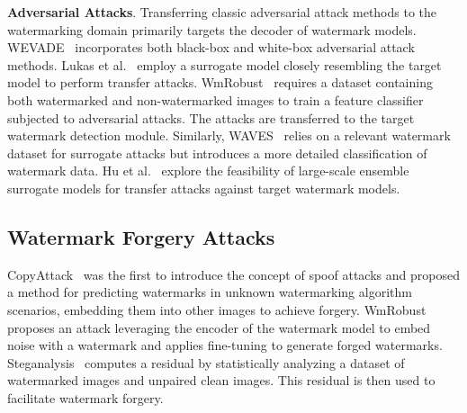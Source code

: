 \textbf{Adversarial Attacks}. Transferring classic adversarial attack methods to the watermarking domain primarily targets the decoder of watermark models. WEVADE~\cite{jiang2023evading} incorporates both black-box and white-box adversarial attack methods. Lukas et al.~\cite{lukas2024leveraging} employ a surrogate model closely resembling the target model to perform transfer attacks. WmRobust~\cite{saberi2023robustness} requires a dataset containing both watermarked and non-watermarked images to train a feature classifier subjected to adversarial attacks. The attacks are transferred to the target watermark detection module. Similarly, WAVES~\cite{an2024benchmarking} relies on a relevant watermark dataset for surrogate attacks but introduces a more detailed classification of watermark data. Hu et al.~\cite{hu2024transfer} explore the feasibility of large-scale ensemble surrogate models for transfer attacks against target watermark models.

\subsection{Watermark Forgery Attacks}
CopyAttack~\cite{kutter2000watermark} was the first to introduce the concept of spoof attacks and proposed a method for predicting watermarks in unknown watermarking algorithm scenarios, embedding them into other images to achieve forgery. WmRobust~\cite{saberi2023robustness} proposes an attack leveraging the encoder of the watermark model to embed noise with a watermark and applies fine-tuning to generate forged watermarks. Steganalysis~\cite{yang2024steganalysis} computes a residual by statistically analyzing a dataset of watermarked images and unpaired clean images. This residual is then used to facilitate watermark forgery.

